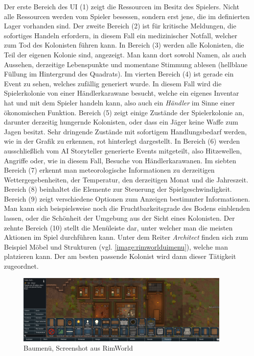 Der erste Bereich des UI (1) zeigt die Ressourcen im Besitz des Spielers. Nicht alle Ressourcen werden vom Spieler besessen, sondern erst jene, die im definierten Lager vorhanden sind.
Der zweite Bereich (2) ist für kritische Meldungen, die sofortiges Handeln erfordern, in diesem Fall ein medizinischer Notfall, welcher zum Tod des Kolonisten führen kann.
In Bereich (3) werden alle Kolonisten, die Teil der eigenen Kolonie sind, angezeigt. Man kann dort sowohl Namen, als auch Aussehen, derzeitige Lebenspunkte und momentane Stimmung ablesen (hellblaue Füllung im Hintergrund des Quadrats).
Im vierten Bereich (4) ist gerade ein Event zu sehen, welches zufällig generiert wurde. In diesem Fall wird die Spielerkolonie von einer Händlerkarawane besucht, welche ein eigenes Inventar hat und mit dem Spieler handeln kann, also auch ein \textit{Händler} im Sinne einer ökonomischen Funktion.
Bereich (5) zeigt einige Zustände der Spielerkolonie an, darunter derzeitig hungernde Kolonisten, oder dass ein Jäger keine Waffe zum Jagen besitzt. Sehr dringende Zustände mit sofortigem Handlungsbedarf werden, wie in der Grafik zu erkennen, rot hinterlegt dargestellt.
In Bereich (6) werden ausschließlich vom AI Storyteller generierte Events mitgeteilt, also Hitzewellen, Angriffe oder, wie in diesem Fall, Besuche von Händlerkarawanen.
Im siebten Bereich (7) erkennt man meteorologische Informationen zu derzeitigen Wettergegebenheiten, der Temperatur, den derzeitigen Monat und die Jahreszeit.
Bereich (8) beinhaltet die Elemente zur Steuerung der Spielgeschwindigkeit.
Bereich (9) zeigt verschiedene Optionen zum Anzeigen bestimmter Informationen. Man kann sich beispielsweise noch die Fruchtbarkeitsgrade des Bodens einblenden lassen, oder die Schönheit der Umgebung aus der Sicht eines Kolonisten.
Der zehnte Bereich (10) stellt die Menüleiste dar, unter welcher man die meisten Aktionen im Spiel durchführen kann. Unter dem Reiter \textit{Architect} finden sich zum Beispiel Möbel und Strukturen (vgl. \autoref{image:rimworlduimenu}), welche man platzieren kann. Der am besten passende Kolonist wird dann dieser Tätigkeit zugeordnet.



\begin{figure}
    \begin{center}
        \includegraphics[width=400px]{0.bilder/rimworlduimenu.png}
    \end{center}
    \caption{Baumenü, Screenshot aus RimWorld} \label{image:rimworlduimenu}
\end{figure}